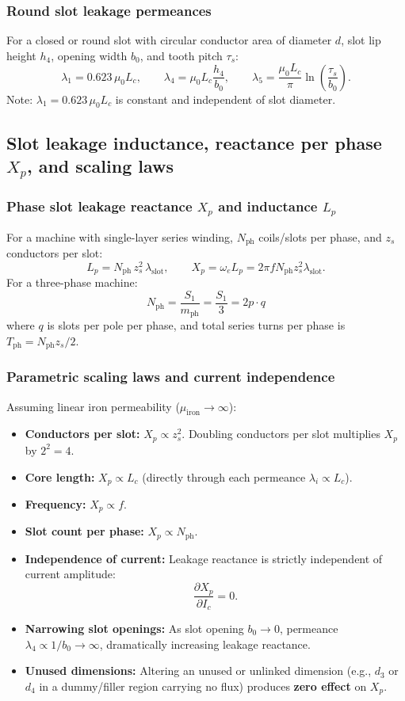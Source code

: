 \subsubsection{Round slot leakage permeances}
For a closed or round slot with circular conductor area of diameter \(d\), slot lip height \(h_4\), opening width \(b_0\), and tooth pitch \(\tau_s\):
\[
\lambda_1 = 0.623\,\mu_0 L_c,
\qquad
\lambda_4 = \mu_0 L_c\frac{h_4}{b_0},
\qquad
\lambda_5 = \frac{\mu_0 L_c}{\pi}\ln\!\left(\frac{\tau_s}{b_0}\right).
\]
Note: \(\lambda_1 = 0.623\,\mu_0 L_c\) is constant and independent of slot diameter.

\subsection{Slot leakage inductance, reactance per phase $X_p$, and scaling laws}

\subsubsection{Phase slot leakage reactance $X_p$ and inductance $L_p$}
For a machine with single-layer series winding, \(N_{\mathrm{ph}}\) coils/slots per phase, and \(z_s\) conductors per slot:
\[
L_p = N_{\mathrm{ph}}\, z_s^2\, \lambda_{\mathrm{slot}},
\qquad
X_p = \omega_e L_p = 2\pi f N_{\mathrm{ph}} z_s^2 \lambda_{\mathrm{slot}}.
\]
For a three-phase machine:
\[
N_{\mathrm{ph}} = \frac{S_1}{m_{\mathrm{ph}}} = \frac{S_1}{3} = 2p \cdot q
\]
where \(q\) is slots per pole per phase, and total series turns per phase is \(T_{\mathrm{ph}} = N_{\mathrm{ph}} z_s / 2\).

\subsubsection{Parametric scaling laws and current independence}
Assuming linear iron permeability (\(\mu_{\mathrm{iron}}\to\infty\)):
\begin{itemize}
  \item \textbf{Conductors per slot:} \(X_p \propto z_s^2\). Doubling conductors per slot multiplies \(X_p\) by \(2^2 = 4\).
  \item \textbf{Core length:} \(X_p \propto L_c\) (directly through each permeance \(\lambda_i \propto L_c\)).
  \item \textbf{Frequency:} \(X_p \propto f\).
  \item \textbf{Slot count per phase:} \(X_p \propto N_{\mathrm{ph}}\).
  \item \textbf{Independence of current:} Leakage reactance is strictly independent of current amplitude:
  \[
  \frac{\partial X_p}{\partial I_c} = 0.
  \]
  \item \textbf{Narrowing slot openings:} As slot opening \(b_0 \to 0\), permeance \(\lambda_4 \propto 1/b_0 \to \infty\), dramatically increasing leakage reactance.
  \item \textbf{Unused dimensions:} Altering an unused or unlinked dimension (e.g., \(d_3\) or \(d_4\) in a dummy/filler region carrying no flux) produces \textbf{zero effect} on \(X_p\).
\end{itemize}

